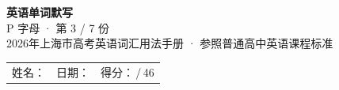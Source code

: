 \documentclass[10pt,a4paper]{article}
\begin{document}
\pagestyle{plain}

\begin{center}
{\LARGE\bfseries 英语单词默写}\\[0.22em]
{\large P 字母 · 第 3 / 7 份}\\[0.18em]
{\small 2026年上海市高考英语词汇用法手册 · 参照普通高中英语课程标准}
\end{center}

\vspace{0.25em}
\noindent\begin{tabular}{@{}p{}@{}p{}@{}p{}@{}}
姓名：\underline{\hspace{2.0cm}} & 日期：\underline{\hspace{2.0cm}} & 得分：\underline{\hspace{1.3cm}}\,/\,46 \\
\end{tabular}

\vspace{0.3em}

\vspace{0.08em}
\end{document}
